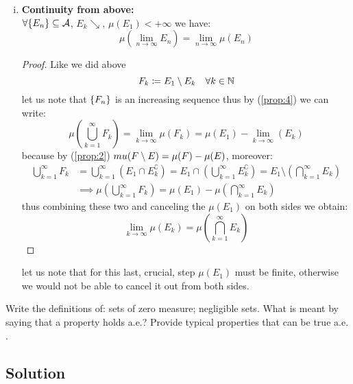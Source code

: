 \begin{enumerate}[i)]
    \item \label{prop:5} \textbf{Continuity from above:} \\
    $\forall \{ E_n \} \subseteq \mathcal{A}$, $E_k\searrow$, $\mu(E_1) < +\infty$ we have:
    \[
        \mu\left( \lim_{n\to\infty} E_n \right) = \lim_{n\to\infty} \mu(E_n)
    \]
    \begin{proof}
    Like we did above 
    \[
            F_k \coloneqq E_1 \setminus E_k \quad \forall k \in\mathbb{N}
    \]
    let us note that $\{ F_n \}$ is an increasing sequence thus by (\ref{prop:4}) we can write:
    \[
        \mu\left( \bigcup_{k=1}^{\infty} F_k \right) = \lim_{k\to\infty} \mu(F_k) = \mu(E_1) - \lim_{k\to\infty}  (E_k)   
    \]
    because by (\ref*{prop:2}) $\\mu(F \setminus E) = \mu(F)-\mu(E)$, moreover:
    \begin{align*}
        \bigcup_{k=1}^{\infty} F_k & = \bigcup_{k=1}^{\infty} (E_1\cap E_k^\complement) = E_1\cap \left( \bigcup_{k=1}^{\infty} E_k^\complement \right) = E_1 \setminus \left( \bigcap_{k=1}^{\infty} E_k \right) \\
        &\implies \mu\left( \bigcup_{k=1}^{\infty} F_k \right) = \mu(E_1) - \mu \left( \bigcap_{k=1}^{\infty} E_k \right)
    \end{align*}
    thus combining these two and canceling the $\mu(E_1)$ on both sides we obtain:
    \[
        \lim_{k\to\infty} \mu(E_k) = \mu \left( \bigcap_{k=1}^{\infty} E_k \right)
    \]
    \end{proof}
    let us note that for this last, crucial, step $\mu(E_1)$ must be finite, otherwise we would not be able to cancel it out from both sides.
\end{enumerate}


\question
Write the definitions of: sets of zero measure; negligible sets. What is meant by saying that a
property holds a.e.? Provide typical properties that can be true a.e. .

\subsection*{Solution}

